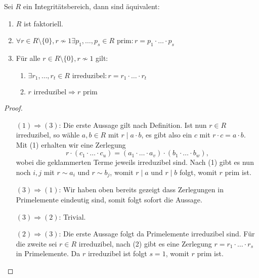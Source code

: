 \begin{proposition}
    Sei $R$ ein Integritätsbereich, dann sind äquivalent:
    \begin{enumerate}
        \item $R$ ist faktoriell.
        \item $ \forall r \in R \setminus \{0\}, r \not\sim 1 \exists p_1, \hdots, p_s \in R \text{ prim}: r = p_1 \cdot \hdots \cdot p_s $
        \item Für alle $ r \in R \setminus \{0\}, r \not\sim 1 $ gilt:
        \begin{enumerate}[label=\roman*.]
            \item $ \exists r_1, \hdots, r_t \in R \text{ irreduzibel}: r = r_1 \cdot \hdots \cdot r_t $
            \item $ r \text{ irreduzibel} \Rightarrow r \text{ prim} $
        \end{enumerate}
    \end{enumerate}
\end{proposition}


\begin{proof}{\ }
    \begin{itemize}[leftmargin=2.5cm]
        \item[$(1) \Rightarrow (3)$:] Die erste Aussage gilt nach Definition. Ist nun $r \in R$ irreduzibel, so wähle $a, b \in R$ mit $r \mid a \cdot b$, es gibt also ein $c$ mit $r \cdot c = a \cdot b$. Mit (1) erhalten wir eine Zerlegung
        $$ r \cdot (c_1 \cdot \hdots \cdot c_u) = (a_1 \cdot \hdots \cdot a_v) \cdot (b_1 \cdot \hdots \cdot b_w), $$
        wobei die geklammerten Terme jeweils irreduzibel sind. Nach (1) gibt es nun noch $i, j$ mit $r \sim a_i$ und $r \sim b_j$, womit $r \mid a$ und $r \mid b$ folgt, womit $r$ prim ist.

        \item[$(3) \Rightarrow (1)$:] Wir haben oben bereits gezeigt dass Zerlegungen in Primelemente eindeutig sind, somit folgt sofort die Aussage.
        
        \item[$(3) \Rightarrow (2)$:] Trivial.

        \item[$(2) \Rightarrow (3)$:] Die erste Aussage folgt da Primelemente irreduzibel sind. Für die zweite sei $r \in R$ irreduzibel, nach (2) gibt es eine Zerlegung $r = r_1 \cdot \hdots \cdot r_s$ in Primelemente. Da $r$ irreduzibel ist folgt $s = 1$, womit $r$ prim ist.
    \end{itemize}
\end{proof}


